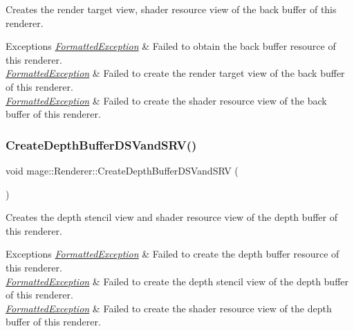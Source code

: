 Creates the render target view, shader resource view of the back buffer of this renderer.


\begin{DoxyExceptions}{Exceptions}
{\em \hyperlink{structmage_1_1_formatted_exception}{Formatted\+Exception}} & Failed to obtain the back buffer resource of this renderer. \\
\hline
{\em \hyperlink{structmage_1_1_formatted_exception}{Formatted\+Exception}} & Failed to create the render target view of the back buffer of this renderer. \\
\hline
{\em \hyperlink{structmage_1_1_formatted_exception}{Formatted\+Exception}} & Failed to create the shader resource view of the back buffer of this renderer. \\
\hline
\end{DoxyExceptions}
\hypertarget{classmage_1_1_renderer_afe5bf4339a31eda5a14d1da48fcfe0e9}{}\label{classmage_1_1_renderer_afe5bf4339a31eda5a14d1da48fcfe0e9} 
\subsubsection{\texorpdfstring{Create\+Depth\+Buffer\+D\+S\+Vand\+S\+R\+V()}{CreateDepthBufferDSVandSRV()}}
{\footnotesize\ttfamily void mage\+::\+Renderer\+::\+Create\+Depth\+Buffer\+D\+S\+Vand\+S\+RV (\begin{DoxyParamCaption}{ }\end{DoxyParamCaption})\hspace{0.3cm}{\ttfamily [private]}}

Creates the depth stencil view and shader resource view of the depth buffer of this renderer.


\begin{DoxyExceptions}{Exceptions}
{\em \hyperlink{structmage_1_1_formatted_exception}{Formatted\+Exception}} & Failed to create the depth buffer resource of this renderer. \\
\hline
{\em \hyperlink{structmage_1_1_formatted_exception}{Formatted\+Exception}} & Failed to create the depth stencil view of the depth buffer of this renderer. \\
\hline
{\em \hyperlink{structmage_1_1_formatted_exception}{Formatted\+Exception}} & Failed to create the shader resource view of the depth buffer of this renderer. \\
\hline
\end{DoxyExceptions}
\hypertarget{classmage_1_1_renderer_a1bd77bf54ea3a7867691785efd183013}{}\label{classmage_1_1_renderer_a1bd77bf54ea3a7867691785efd183013} 
